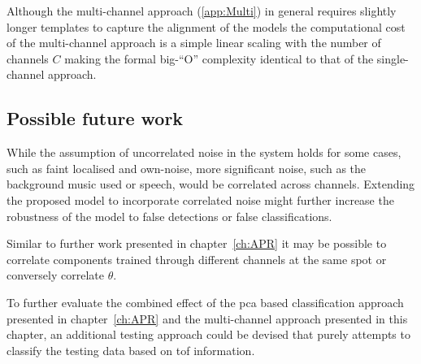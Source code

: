 Although the multi-channel approach (\ref{app:Multi}) in general requires slightly longer templates to capture the alignment of the models the computational cost of the multi-channel approach is a simple linear scaling with the number of channels $C$ making the formal big-``O'' complexity identical to that of the single-channel approach.

\subsection{Possible future work}
While the assumption of uncorrelated noise in the system holds for some cases, such as faint localised and own-noise, more significant noise, such as the background music used or speech, would be correlated across channels. Extending the proposed model to incorporate correlated noise might further increase the robustness of the model to false detections or false classifications.

Similar to further work presented in chapter~\ref{ch:APR} it may be possible to correlate components trained through different channels at the same spot or conversely correlate $\theta$.



To further evaluate the combined effect of the \DIFdelbegin {}\DIFdelend \DIFaddbegin \gls{pca} \DIFaddend based classification approach presented in chapter~\ref{ch:APR} and the multi-channel approach presented in this chapter, an additional testing approach could be devised that purely attempts to classify the testing data based on \DIFdelbegin {}\DIFdelend \DIFaddbegin \gls{tof} \DIFaddend information.



